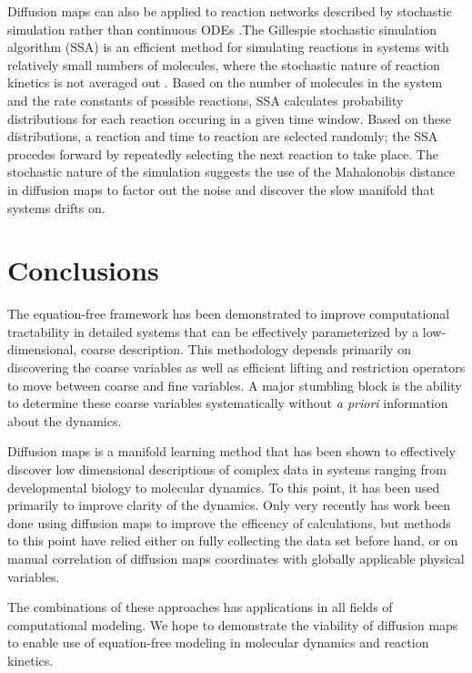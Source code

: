 \documentclass[12pt]{article}
\begin{document}
Diffusion maps can also be applied to reaction networks described by stochastic simulation rather than continuous ODEs \cite{Dsilva2013}.The Gillespie stochastic simulation algorithm (SSA) is an efficient method for simulating reactions in systems with relatively small numbers of molecules, where the stochastic nature of reaction kinetics is not averaged out \cite{Gillespie1977}. Based on the number of molecules in the system and the rate constants of possible reactions, SSA calculates probability distributions for each reaction occuring in a given time window. Based on these distributions, a reaction and time to reaction are selected randomly; the SSA procedes forward by repeatedly selecting the next reaction to take place. The stochastic nature of the simulation suggests the use of the Mahalonobis distance in diffusion maps to factor out the noise and discover the slow manifold that systems drifts on.

\section{Conclusions}

The equation-free framework has been demonstrated to improve computational tractability in detailed systems that can be effectively parameterized by a low-dimensional, coarse description. This methodology depends primarily on discovering the coarse variables as well as efficient lifting and restriction operators to move between coarse and fine variables. A major stumbling block is the ability to determine these coarse variables systematically without \textit{a priori} information about the dynamics. \vspace{1mm}

Diffusion maps is a manifold learning method that has been shown to effectively discover low dimensional descriptions of complex data in systems ranging from developmental biology to molecular dynamics. To this point, it has been used primarily to improve clarity of the dynamics. Only very recently has work been done using diffusion maps to improve the efficency of calculations, but methods to this point have relied either on fully collecting the data set before hand, or on manual correlation of diffusion maps coordinates with globally applicable physical variables. \vspace{1mm}

The combinations of these approaches has applications in all fields of computational modeling. We hope to demonstrate the viability of diffusion maps to enable use of equation-free modeling in molecular dynamics and reaction kinetics.



\end{document}
